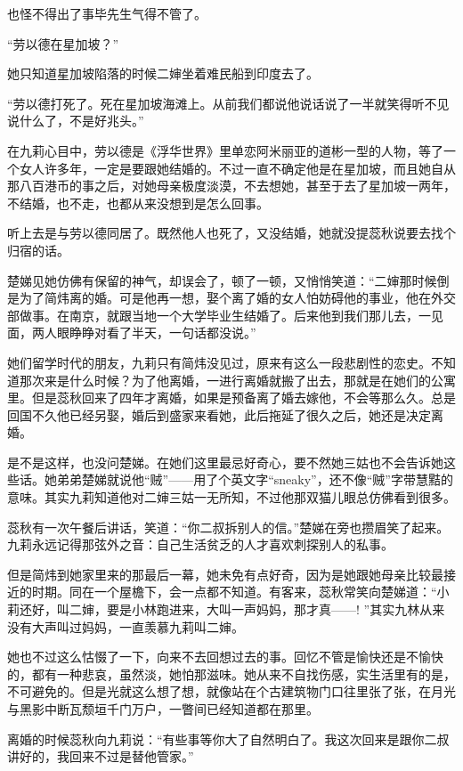 \par 也怪不得出了事毕先生气得不管了。
\par “劳以德在星加坡？”
\par 她只知道星加坡陷落的时候二婶坐着难民船到印度去了。
\par “劳以德打死了。死在星加坡海滩上。从前我们都说他说话说了一半就笑得听不见说什么了，不是好兆头。”
\par 在九莉心目中，劳以德是《浮华世界》里单恋阿米丽亚的道彬一型的人物，等了一个女人许多年，一定是要跟她结婚的。不过一直不确定他是在星加坡，而且她自从那八百港币的事之后，对她母亲极度淡漠，不去想她，甚至于去了星加坡一两年，不结婚，也不走，也都从来没想到是怎么回事。
\par 听上去是与劳以德同居了。既然他人也死了，又没结婚，她就没提蕊秋说要去找个归宿的话。
\par 楚娣见她仿佛有保留的神气，却误会了，顿了一顿，又悄悄笑道：“二婶那时候倒是为了简炜离的婚。可是他再一想，娶个离了婚的女人怕妨碍他的事业，他在外交部做事。在南京，就跟当地一个大学毕业生结婚了。后来他到我们那儿去，一见面，两人眼睁睁对看了半天，一句话都没说。”
\par 她们留学时代的朋友，九莉只有简炜没见过，原来有这么一段悲剧性的恋史。不知道那次来是什么时候？为了他离婚，一进行离婚就搬了出去，那就是在她们的公寓里。但是蕊秋回来了四年才离婚，如果是预备离了婚去嫁他，不会等那么久。总是回国不久他已经另娶，婚后到盛家来看她，此后拖延了很久之后，她还是决定离婚。
\par 是不是这样，也没问楚娣。在她们这里最忌好奇心，要不然她三姑也不会告诉她这些话。她弟弟楚娣就说他“贼”——用了个英文字“sneaky”，还不像“贼”字带慧黠的意味。其实九莉知道他对二婶三姑一无所知，不过他那双猫儿眼总仿佛看到很多。
\par 蕊秋有一次午餐后讲话，笑道：“你二叔拆别人的信。”楚娣在旁也攒眉笑了起来。九莉永远记得那弦外之音：自己生活贫乏的人才喜欢刺探别人的私事。
\par 但是简炜到她家里来的那最后一幕，她未免有点好奇，因为是她跟她母亲比较最接近的时期。同在一个屋檐下，会一点都不知道。有客来，蕊秋常笑向楚娣道：“小莉还好，叫二婶，要是小林跑进来，大叫一声妈妈，那才真——! ”其实九林从来没有大声叫过妈妈，一直羡慕九莉叫二婶。
\par 她也不过这么怙惙了一下，向来不去回想过去的事。回忆不管是愉快还是不愉快的，都有一种悲哀，虽然淡，她怕那滋味。她从来不自找伤感，实生活里有的是，不可避免的。但是光就这么想了想，就像站在个古建筑物门口往里张了张，在月光与黑影中断瓦颓垣千门万户，一瞥间已经知道都在那里。
\par 离婚的时候蕊秋向九莉说：“有些事等你大了自然明白了。我这次回来是跟你二叔讲好的，我回来不过是替他管家。”
